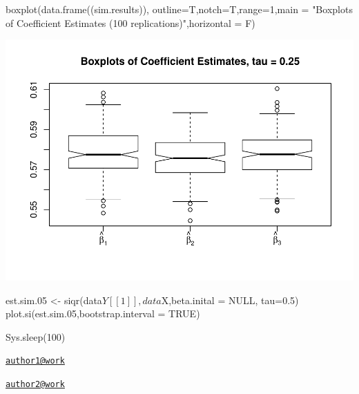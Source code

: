 \begin{Schunk}
\begin{Sinput}
boxplot(data.frame((sim.results)), outline=T,notch=T,range=1,main = "Boxplots of Coefficient Estimates (100 replications)",horizontal = F)
\end{Sinput}

\includegraphics{siqr_files/figure-latex/unnamed-chunk-8-1} \end{Schunk}

\begin{Schunk}
\begin{Sinput}
est.sim.05 <- siqr(data$Y[[1]],data$X,beta.inital = NULL, tau=0.5)
plot.si(est.sim.05,bootstrap.interval = TRUE)
\end{Sinput}
\end{Schunk}

\begin{Schunk}
\begin{Sinput}
Sys.sleep(100)
\end{Sinput}
\end{Schunk}




\address{%
Author One\\
Affiliation\\
line 1\\ line 2\\
}
\href{mailto:author1@work}{\nolinkurl{author1@work}}

\address{%
Author Two\\
Affiliation\\
line 1\\ line 2\\
}
\href{mailto:author2@work}{\nolinkurl{author2@work}}


